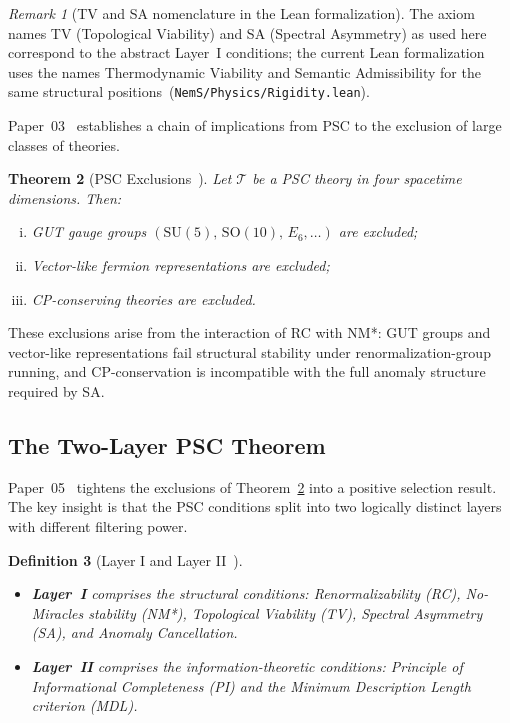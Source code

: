 \documentclass[11pt,twocolumn]{article}
\newtheorem{theorem}{Theorem}[section]
\newtheorem{definition}[theorem]{Definition}
\theoremstyle{remark}
\newtheorem{remark}[theorem]{Remark}
\begin{document}
\begin{remark}[TV and SA nomenclature in the Lean formalization]
The axiom names TV (Topological Viability) and SA (Spectral Asymmetry) as used here correspond to the abstract Layer~I conditions; the current Lean formalization uses the names Thermodynamic Viability and Semantic Admissibility for the same structural positions~(\texttt{NemS/Physics/Rigidity.lean}).
\end{remark}

Paper~03~\cite{SpivackNMstar} establishes a chain of implications
from PSC to the exclusion of large classes of theories.

\begin{theorem}[PSC Exclusions~{\cite{SpivackNMstar}}]
\label{thm:exclusions}
Let $\mathcal{T}$ be a PSC theory in four spacetime dimensions.
Then:
\begin{enumerate}[(i)]
  \item GUT gauge groups $(\mathrm{SU}(5),\, \mathrm{SO}(10),\,
        E_6,\ldots)$ are excluded;
  \item Vector-like fermion representations are excluded;
  \item CP-conserving theories are excluded.
\end{enumerate}
\end{theorem}

These exclusions arise from the interaction of RC with NM*: GUT groups
and vector-like representations fail structural stability under
renormalization-group running, and CP-conservation is incompatible
with the full anomaly structure required by SA.

\subsection{The Two-Layer PSC Theorem}
\label{sec:two-layer}

Paper~05~\cite{SpivackPSCOpt} tightens the exclusions of
Theorem~\ref{thm:exclusions} into a positive selection result.
The key insight is that the PSC conditions split into two logically
distinct layers with different filtering power.

\begin{definition}[Layer I and Layer II~{\cite{SpivackPSCOpt}}]
\label{def:layers}
\begin{itemize}
  \item \textbf{Layer~I} comprises the structural conditions:
        Renormalizability (RC), No-Miracles stability (NM*),
        Topological Viability (TV), Spectral Asymmetry (SA),
        and Anomaly Cancellation.
  \item \textbf{Layer~II} comprises the information-theoretic
        conditions: Principle of Informational Completeness (PI)
        and the Minimum Description Length criterion (MDL).
\end{itemize}
\end{definition}
\end{document}

